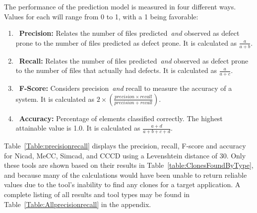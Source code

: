 \documentclass[smallextended]{svjour3}       %
\begin{document}
The performance of the prediction model is measured in four different ways. Values for each will range from 0 to 1, with a 1 being favorable:
\begin{enumerate}
  \item~\textbf{Precision:} Relates the number of files predicted~\emph{and} observed as defect prone to the number of files predicted as defect prone. It is calculated as $\frac{a}{a+b}$.

  \item~\textbf{Recall:} Relates the number of files predicted~\emph{and} observed as defect prone to the number of files that actually had defects. It is calculated as $\frac{a}{a+c}$.

  \item~\textbf{F-Score:} Considers precision~\emph{and} recall to measure the accuracy of a system. It is calculated as $2\times(\frac{precision\times recall}{precision+recall})$.

 \item~\textbf{Accuracy:} Percentage of elements classified correctly. The highest attainable value is 1.0. It is calculated as $\frac{a+d}{a+b+c+d}$.

\end{enumerate}

Table~\ref{Table:precisionrecall} displays the precision, recall, F-score and accuracy for Nicad, MeCC, Simcad, and CCCD using a Levenshtein distance of 30. Only these tools are shown based on their results in Table~\ref{table:ClonesFoundByType}, and because many of the calculations would have been unable to return reliable values due to the tool's inability to find any clones for a target application. A complete listing of all results and tool types may be found in Table~\ref{Table:Allprecisionrecall} in the appendix.
\end{document}
